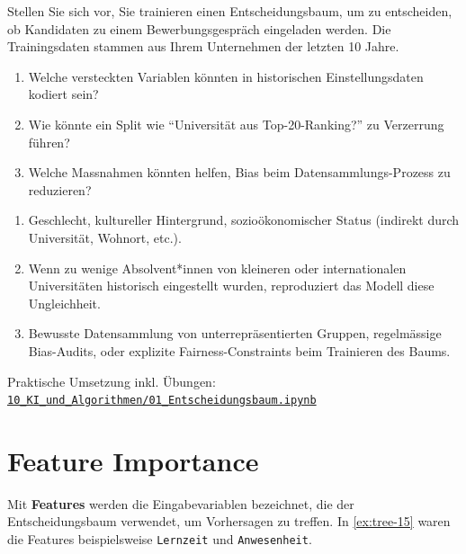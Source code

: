 \begin{mychallenge}
    Stellen Sie sich vor, Sie trainieren einen Entscheidungsbaum, um zu entscheiden, ob Kandidaten zu einem Bewerbungsgespräch eingeladen werden.
    Die Trainingsdaten stammen aus Ihrem Unternehmen der letzten 10 Jahre.
    \begin{enumerate}
        \item Welche versteckten Variablen könnten in historischen Einstellungsdaten kodiert sein?
        \item Wie könnte ein Split wie \enquote{Universität aus Top-20-Ranking?} zu Verzerrung führen?
        \item Welche Massnahmen könnten helfen, Bias beim Datensammlungs-Prozess zu reduzieren?
    \end{enumerate}
    \begin{myanswer}
        \begin{enumerate}
            \item Geschlecht, kultureller Hintergrund, sozioökonomischer Status (indirekt durch Universität, Wohnort, etc.).
            \item Wenn zu wenige Absolvent*innen von kleineren oder internationalen Universitäten historisch eingestellt wurden, reproduziert das Modell diese Ungleichheit.
            \item Bewusste Datensammlung von unterrepräsentierten Gruppen, regelmässige Bias-Audits, oder explizite Fairness-Constraints beim Trainieren des Baums.
        \end{enumerate}
    \end{myanswer}
\end{mychallenge}

\begin{myremark}[Notebook]
    Praktische Umsetzung inkl. Übungen:
    \href{\notebookurl}{\texttt{10\_KI\_und\_Algorithmen/01\_Entscheidungsbaum.ipynb}}
\end{myremark}


\section{Feature Importance}
\begin{mydefinition}[Features]
    Mit \textbf{Features} werden die Eingabevariablen bezeichnet, die der Entscheidungsbaum verwendet, um Vorhersagen zu treffen. In \cref{ex:tree-15} waren die Features beispielsweise \texttt{Lernzeit} und \texttt{Anwesenheit}.
\end{mydefinition}

